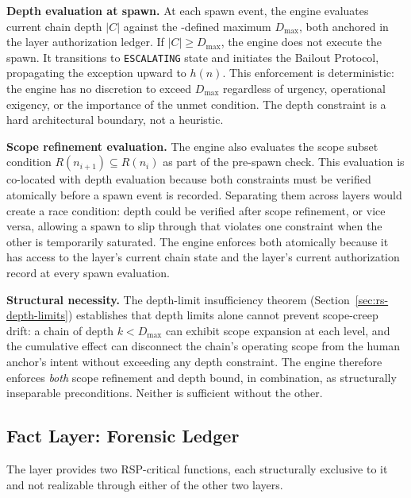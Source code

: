 \medskip
\noindent\textbf{Depth evaluation at spawn.} At each spawn event, the \bounds{} engine evaluates current chain depth $|C|$ against the \purpose{}-defined maximum $D_{\mathrm{max}}$, both anchored in the \fact{} layer authorization ledger. If $|C| \geq D_{\mathrm{max}}$, the \bounds{} engine does not execute the spawn. It transitions to \texttt{ESCALATING} state and initiates the Bailout Protocol, propagating the exception upward to $h(n)$. This enforcement is deterministic: the \bounds{} engine has no discretion to exceed $D_{\mathrm{max}}$ regardless of urgency, operational exigency, or the importance of the unmet condition. The depth constraint is a hard architectural boundary, not a heuristic.

\medskip
\noindent\textbf{Scope refinement evaluation.} The \bounds{} engine also evaluates the scope subset condition $R(n_{i+1}) \subseteq R(n_i)$ as part of the pre-spawn check. This evaluation is co-located with depth evaluation because both constraints must be verified atomically before a spawn event is recorded. Separating them across layers would create a race condition: depth could be verified after scope refinement, or vice versa, allowing a spawn to slip through that violates one constraint when the other is temporarily saturated. The \bounds{} engine enforces both atomically because it has access to the \fact{} layer's current chain state and the \purpose{} layer's current authorization record at every spawn evaluation.

\medskip
\noindent\textbf{Structural necessity.} The depth-limit insufficiency theorem (Section~\ref{sec:rs-depth-limits}) establishes that depth limits alone cannot prevent scope-creep drift: a chain of depth $k < D_{\mathrm{max}}$ can exhibit scope expansion at each level, and the cumulative effect can disconnect the chain's operating scope from the human anchor's intent without exceeding any depth constraint. The \bounds{} engine therefore enforces \emph{both} scope refinement and depth bound, in combination, as structurally inseparable preconditions. Neither is sufficient without the other.

\subsection{Fact Layer: Forensic Ledger}
\label{sec:rs-fact-ledger}

The \fact{} layer provides two RSP-critical functions, each structurally exclusive to it and not realizable through either of the other two layers.

